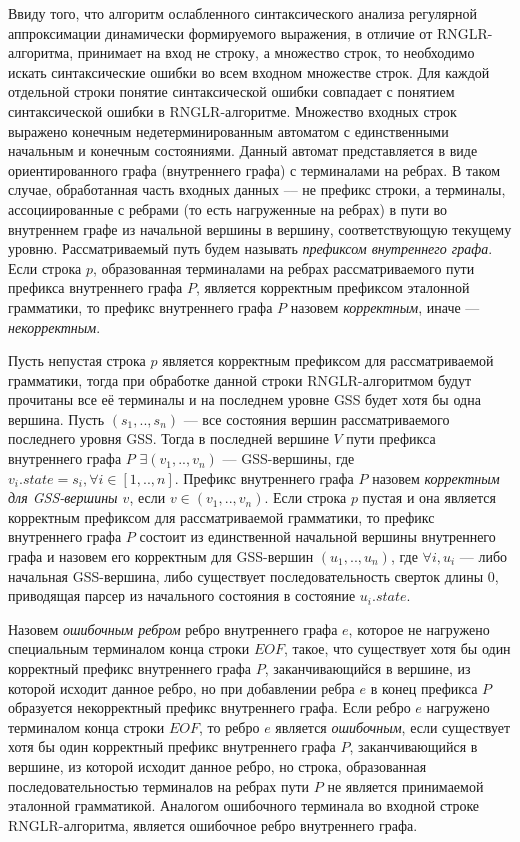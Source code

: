 Ввиду того, что алгоритм ослабленного синтаксического анализа регулярной аппроксимации динамически формируемого выражения, в отличие от RNGLR-алгоритма, принимает на вход не строку, а множество строк, то необходимо искать синтаксические ошибки во всем входном множестве строк. Для каждой отдельной строки понятие синтаксической ошибки совпадает с понятием синтаксической ошибки в RNGLR-алгоритме. Множество входных строк выражено конечным недетерминированным автоматом с единственными начальным и конечным состояниями. Данный автомат представляется в виде ориентированного графа (внутреннего графа) с терминалами на ребрах. В таком случае, обработанная часть входных данных --– не префикс строки, а терминалы, ассоциированные с ребрами (то есть нагруженные на ребрах) в пути во внутреннем графе из начальной вершины в вершину, соответствующую текущему уровню. Рассматриваемый путь будем называть \emph{префиксом внутреннего графа}. Если строка $p$, образованная терминалами на ребрах рассматриваемого пути префикса внутреннего графа $P$, является корректным префиксом эталонной грамматики, то префикс внутреннего графа $P$ назовем \emph{корректным}, иначе --- \emph{некорректным}.

Пусть непустая строка $p$ является корректным префиксом для рассматриваемой грамматики, тогда при обработке данной строки RNGLR-алгоритмом будут прочитаны все её терминалы и на последнем уровне GSS будет хотя бы одна вершина. Пусть $(s_{1},..,s_{n})$ --- все состояния вершин рассматриваемого последнего уровня GSS. Тогда в последней вершине $V$ пути префикса внутреннего графа $P$ $\exists (v_{1},..,v_{n})$ --- GSS-вершины, где $v_{i}.state = s_{i}, \forall i \in [1,..,n]$. Префикс внутреннего графа $P$ назовем \emph{корректным для GSS-вершины $v$}, если $v \in (v_{1},..,v_{n})$.  Если строка $p$ пустая и она является корректным префиксом для рассматриваемой грамматики, то префикс внутреннего графа $P$ состоит из единственной начальной вершины внутреннего графа и назовем его корректным для GSS-вершин $(u_{1},..,u_{n})$, где $\forall i, u_{i}$ --- либо начальная GSS-вершина, либо существует последовательность сверток длины 0, приводящая парсер из начального состояния в состояние $u_{i}.state$.

Назовем \emph{ошибочным ребром} ребро внутреннего графа $e$, которое не нагружено специальным терминалом конца строки $EOF$, такое, что существует хотя бы один корректный префикс внутреннего графа $P$, заканчивающийся в вершине, из которой исходит данное ребро, но при добавлении ребра $e$ в конец префикса $P$ образуется некорректный префикс внутреннего графа. Если ребро $e$ нагружено терминалом конца строки $EOF$, то ребро $e$ является \emph{ошибочным}, если существует хотя бы один корректный префикс внутреннего графа $P$, заканчивающийся в вершине, из которой исходит данное ребро, но строка, образованная последовательностью терминалов на ребрах пути $P$ не является принимаемой эталонной грамматикой. Аналогом ошибочного терминала во входной строке RNGLR-алгоритма, является ошибочное ребро внутреннего графа.

